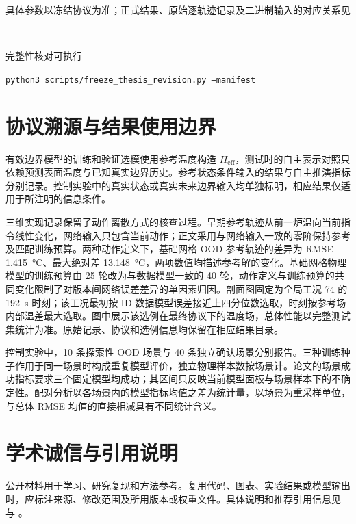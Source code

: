 \documentclass[UTF8,zihao=-4,openany,fontset=mac]{ctexrep}
\newcommand{\Heff}{{H_{\mathrm{eff}}}}
\begin{document}
具体参数以冻结协议为准；正式结果、原始逐轨迹记录及二进制输入的对应关系见
\begin{center}
  \\
\end{center}
完整性核对可执行
\begin{center}
  \small\texttt{python3 scripts/freeze\_thesis\_revision.py --manifest}\\
\end{center}

\section{协议溯源与结果使用边界}

有效边界模型的训练和验证选模使用参考温度构造 $\Heff$，测试时的自主表示对照只依赖预测表面温度与已知真实边界历史。参考状态条件输入的结果与自主推演指标分别记录。控制实验中的真实状态或真实未来边界输入均单独标明，相应结果仅适用于所注明的信息条件。

三维实现记录保留了动作离散方式的核查过程。早期参考轨迹从前一炉温向当前指令线性变化，网络输入只包含当前动作；正文采用与网络输入一致的零阶保持参考及匹配训练预算。两种动作定义下，基础网格 OOD 参考轨迹的差异为 RMSE \SI{1.415}{\degreeCelsius}、最大绝对差 \SI{13.148}{\degreeCelsius}，两项数值均描述参考解的变化。基础网格物理模型的训练预算由 25 轮改为与数据模型一致的 40 轮，动作定义与训练预算的共同变化限制了对版本间网络误差差异的单因素归因。剖面图固定为全局工况 74 的 \SI{192}{\second} 时刻；该工况最初按 ID 数据模型误差接近上四分位数选取，时刻按参考场内部温差最大选取。图中展示该选例在最终协议下的温度场，总体性能以完整测试集统计为准。原始记录、协议和选例信息均保留在相应结果目录。

控制实验中，10 条探索性 OOD 场景与 40 条独立确认场景分别报告。三种训练种子作用于同一场景时构成重复模型评价，独立物理样本数按场景计。论文的场景成功指标要求三个固定模型均成功；其区间只反映当前模型面板与场景样本下的不确定性。配对分析以各场景内的模型指标均值之差为统计量，以场景为重采样单位，与总体 RMSE 均值的直接相减具有不同统计含义。

\section{学术诚信与引用说明}

公开材料用于学习、研究复现和方法参考。复用代码、图表、实验结果或模型输出时，应标注来源、修改范围及所用版本或权重文件。具体说明和推荐引用信息见  与 。
\end{document}
